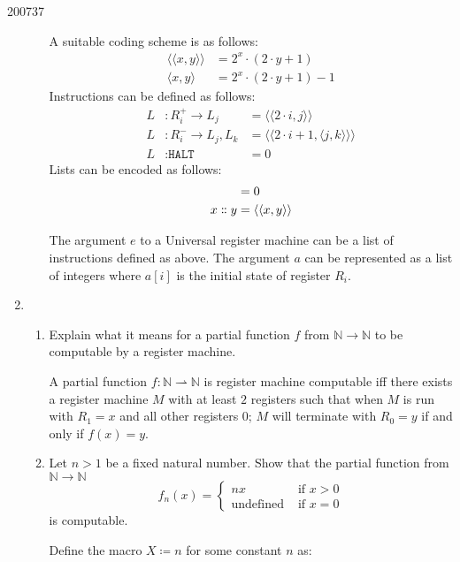 \documentclass[10pt,\jkfside,a4paper]{article}
\begin{document}
\begin{examquestion}{2007}{3}{7}
\begin{enumerate}
\begin{enumerate}
A suitable coding scheme is as follows:
\begin{align*}
\langle \langle x, y \rangle \rangle &= 2^x \cdot (2 \cdot y + 1) \\
\langle x, y \rangle &= 2^x \cdot (2 \cdot y + 1) - 1
\end{align*}
Instructions can be defined as follows:
\begin{align*}
L &: R_i^+ \to L_j &= \langle \langle 2 \cdot i, j \rangle \rangle \\
L &: R_i^- \to L_j, L_k &= \langle \langle 2 \cdot i + 1, \langle j, k \rangle
\rangle \rangle \\
L &: \texttt{HALT} &= 0
\end{align*}
Lists can be encoded as follows:
\begin{align*}
[\ ] &= 0 \\
x \dblcolon y &= \langle \langle x, y \rangle \rangle
\end{align*}

The argument $e$ to a Universal register machine can be a list of
instructions defined as above. The argument $a$ can be represented as a list
of integers where $a[i]$ is the initial state of register $R_i$.

\end{enumerate}

\item

\begin{enumerate}

\item Explain what it means for a partial function $f$ from $\mathbb{N} \to
\mathbb{N}$ to be computable by a register machine.

A partial function $f: \mathbb{N} \rightharpoonup \mathbb{N}$ is register
machine computable iff there exists a register machine $M$ with at least $2$
registers such that when $M$ is run with $R_1 = x$ and all other registers 0;
$M$ will terminate with $R_0 = y$ if and only if $f(x) = y$.

\item Let $n > 1$ be a fixed natural number. Show that the partial function
from $\mathbb{N} \to \mathbb{N}$
\[
f_n(x) = \begin{cases}
nx & \text{ if } x > 0 \\
\text{undefined} & \text{ if } x = 0
\end{cases}
\]
is computable.

Define the macro $X \coloneqq n$ for some constant $n$ as:
\begin{center}
\end{center}


\end{enumerate}
\end{enumerate}
\end{examquestion}
\end{document}
